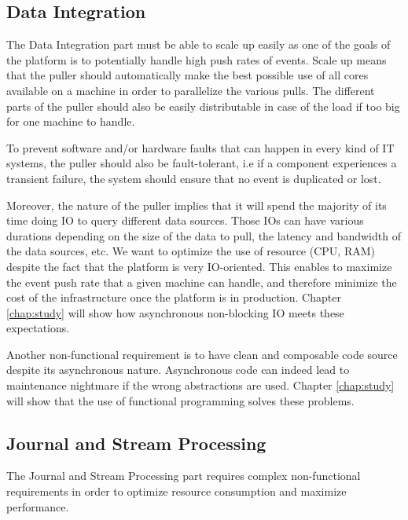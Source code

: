 \subsection{Data Integration}

The Data Integration part must be able to scale up easily as one of the goals of the platform is to potentially handle high push rates of events. Scale up means that the puller should automatically make the best possible use of all cores available on a machine in order to parallelize the various pulls. The different parts of the puller should also be easily distributable in case of the load if too big for one machine to handle. 

To prevent software and/or hardware faults that can happen in every kind of IT systems, the puller should also be fault-tolerant, i.e if a component experiences a transient failure, the system should ensure that no event is duplicated or lost.

Moreover, the nature of the puller implies that it will spend the majority of its time doing IO to query different data sources.
Those IOs can have various durations depending on the size of the data to pull, the latency and bandwidth of the data sources, etc.
We want to optimize the use of resource (CPU, RAM) despite the fact that the platform is very IO-oriented. This enables to maximize the event push rate that a given machine can handle, and therefore minimize the cost of the infrastructure once the platform is in production. Chapter \ref{chap:study} will show how asynchronous non-blocking IO meets these expectations. 

Another non-functional requirement is to have clean and composable code source despite its asynchronous nature. Asynchronous
code can indeed lead to maintenance nightmare if the wrong abstractions are used. Chapter \ref{chap:study} will
show that the use of functional programming solves these problems.

\subsection{Journal and Stream Processing}

The Journal and Stream Processing part requires complex non-functional requirements in order to optimize resource consumption and maximize performance.

